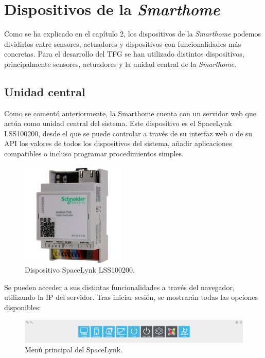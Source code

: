 \section{Dispositivos de la \textit{Smarthome}}

Como se ha explicado en el capítulo 2, los dispositivos de la \textit{Smarthome} podemos dividirlos entre sensores, actuadores y dispositivos con funcionalidades más concretas. Para el desarrollo del TFG se han utilizado distintos dispositivos, principalmente sensores, actuadores y la unidad central de la \textit{Smarthome}.

\subsection{Unidad central}

Como se comentó anteriormente, la Smarthome cuenta con un servidor web que actúa como unidad central del sistema. Este dispositivo es el SpaceLynk LSS100200, desde el que se puede controlar a través de su interfaz web o de su API los valores de todos los dispositivos del sistema, añadir aplicaciones compatibles o incluso programar procedimientos simples\cite{cap3_1}.

\begin{figure}[h]
    \centering
    \includegraphics{imagenes/capitulo3/SpaceLynk_dispositivo.jpg}
    \caption{Dispositivo SpaceLynk LSS100200.}
    \label{fig:spacelynk_dispositivo}
\end{figure}

Se pueden acceder a sus distintas funcionalidades a través del navegador, utilizando la IP del servidor. Tras iniciar sesión, se mostrarán todas las opciones disponibles:

\begin{figure}[h]
    \centering
    \includegraphics[width=1\textwidth, keepaspectratio]{imagenes/capitulo3/menuSpaceLynk.png}
    \caption{Menú principal del SpaceLynk.}
    \label{fig:spacelynk_menu}
\end{figure}

